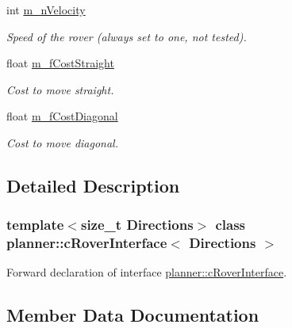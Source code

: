 \begin{DoxyCompactItemize}
int \mbox{\hyperlink{classplanner_1_1c_rover_interface_a458f3e469a13cfc909e957678ddee753}{m\+\_\+n\+Velocity}}
\begin{DoxyCompactList}\small\item\em Speed of the rover (always set to one, not tested). \end{DoxyCompactList}\item 
\mbox{\label{classplanner_1_1c_rover_interface_a8378fd644c70195336ffdb6a61b14884}} 
float \mbox{\hyperlink{classplanner_1_1c_rover_interface_a8378fd644c70195336ffdb6a61b14884}{m\+\_\+f\+Cost\+Straight}}
\begin{DoxyCompactList}\small\item\em Cost to move straight. \end{DoxyCompactList}\item 
\mbox{\label{classplanner_1_1c_rover_interface_a622dc2ed266037b2b50dbbd9227c0cc0}} 
float \mbox{\hyperlink{classplanner_1_1c_rover_interface_a622dc2ed266037b2b50dbbd9227c0cc0}{m\+\_\+f\+Cost\+Diagonal}}
\begin{DoxyCompactList}\small\item\em Cost to move diagonal. \end{DoxyCompactList}\end{DoxyCompactItemize}


\subsection{Detailed Description}
\subsubsection*{template$<$size\+\_\+t Directions$>$\newline
class planner\+::c\+Rover\+Interface$<$ Directions $>$}

Forward declaration of interface \mbox{\hyperlink{classplanner_1_1c_rover_interface}{planner\+::c\+Rover\+Interface}}. 

\subsection{Member Data Documentation}
\mbox{\label{classplanner_1_1c_rover_interface_a8e1ffb06f3301b9440da125666ecdc4f}} 
